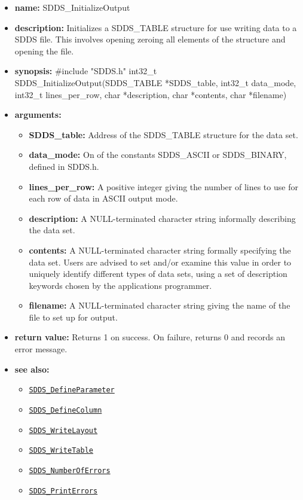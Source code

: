 \documentclass[11pt]{article}
\newcommand{\progref}[1]{\hyperref[SDDS_#1]{\tt SDDS\_#1}}
\begin{document}
\begin{itemize}
\item {\bf name:}\newline
SDDS\_InitializeOutput
\item {\bf description:}\newline
Initializes a SDDS\_TABLE structure for use writing data to a SDDS file. This involves opening zeroing all elements of the structure and opening the file.
\item {\bf synopsis:} \#include "SDDS.h"\newline
int32\_t SDDS\_InitializeOutput(SDDS\_TABLE *SDDS\_table, int32\_t data\_mode, int32\_t lines\_per\_row, char *description, char *contents, char *filename)
\item {\bf arguments:}
\begin{itemize}
\item {\bf SDDS\_table:} Address of the SDDS\_TABLE structure for the data set.
\item {\bf data\_mode:} On of the constants SDDS\_ASCII or SDDS\_BINARY, defined in  SDDS.h.
\item {\bf lines\_per\_row:} A positive integer giving the number of lines to use for each row of data in ASCII output mode.
\item {\bf description:} A NULL-terminated character string informally describing the data set.
\item {\bf contents:} A NULL-terminated character string formally specifying the data set. Users are advised to set and/or examine this value in order to uniquely identify different types of data sets, using a set of description keywords chosen by the applications programmer.
\item {\bf filename:} A NULL-terminated character string giving the name of the file to set up for output.
\end{itemize}
\item {\bf return value:}\newline
Returns 1 on success. On failure, returns 0 and records an error message.
\item {\bf see also:}
\begin{itemize}
\item \progref{DefineParameter}
\item \progref{DefineColumn}
\item \progref{WriteLayout}
\item \progref{WriteTable}
\item \progref{NumberOfErrors}
\item \progref{PrintErrors}
\end{itemize}
\end{itemize}
\end{document}
